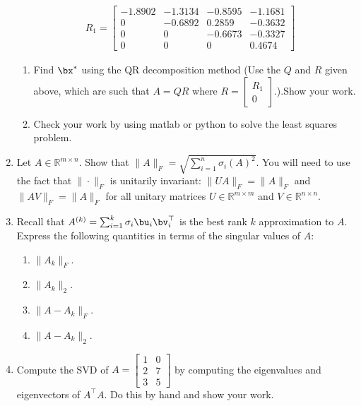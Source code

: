 \documentclass[10pt]{article}
\begin{document}
\begin{enumerate}
\begin{align*}
&  R_1 = \left[\begin{matrix} -1.8902 & -1.3134 & -0.8595 & -1.1681 \\ 0 & -0.6892 & 0.2859 & -0.3632 \\ 0 & 0 & -0.6673 & -0.3327 \\ 0 & 0 & 0 & 0.4674 \end{matrix}\right]
\end{align*}
\begin{enumerate}
	\item Find $\bx^{*}$ using the QR decomposition method (Use the $Q$ and $R$ given above, which are such that $A = QR$ where $R = \left[\begin{matrix} R_1 \\ 0 \end{matrix}\right]$.).Show your work. \\
	
	\item Check your work by using matlab or python to solve the least squares problem.
\end{enumerate}


\item Let $A\in\mathbb{R}^{m\times n}$. Show that $\|A\|_{F} = \sqrt{\sum_{i=1}^{n}\sigma_{i}(A)^{2}}$. You will need to use the fact that $\|\cdot\|_{F}$ is unitarily invariant: $\|UA\|_{F} = \|A\|_{F}$ and $\|AV\|_{F} = \|A\|_{F}$ for all unitary matrices $U\in\mathbb{R}^{m\times m}$ and $V\in\mathbb{R}^{n\times n}$. 

\item Recall that $A^{(k)} = \sum_{i=1}^{k} \sigma_i\bu_{i}\bv_{i}^{\top}$ is the best rank $k$ approximation to $A$. Express the following quantities in terms of the singular values of $A$:
\begin{enumerate}
	\item $\|A_{k}\|_{F}$. \\
	\item $\|A_{k}\|_{2}$. \\
	\item $\|A - A_{k}\|_{F}$. \\
	\item $\|A - A_{k}\|_{2}$. \\
\end{enumerate}

\item Compute the SVD of $\displaystyle A = \left[\begin{matrix} 1 & 0 \\ 2 & 7 \\ 3 & 5 \end{matrix}\right]$ by computing the eigenvalues and eigenvectors of $A^{\top}A$. Do this by hand and show your work. \\


\end{enumerate}
\end{document}
